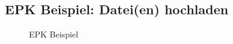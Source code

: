 \subsection{EPK Beispiel: Datei(en) hochladen}
\label{app:EPK}
\begin{figure}[htb]
\centering
{}
\caption{EPK Beispiel}
\end{figure}